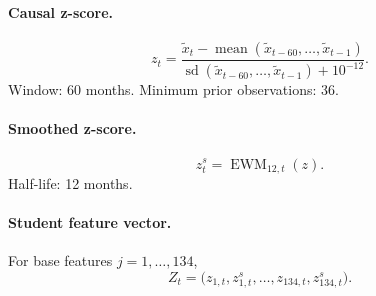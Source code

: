 \paragraph{Causal z-score.}
\begin{equation}
z_t
=
\frac{
\widetilde{x}_t-
\operatorname{mean}(\widetilde{x}_{t-60},\ldots,\widetilde{x}_{t-1})
}{
\operatorname{sd}(\widetilde{x}_{t-60},\ldots,\widetilde{x}_{t-1})+10^{-12}
}.
\end{equation}
Window: 60 months. Minimum prior observations: 36.

\paragraph{Smoothed z-score.}
\begin{equation}
z^s_t
=
\operatorname{EWM}_{12,t}(z).
\end{equation}
Half-life: 12 months.

\paragraph{Student feature vector.}
For base features \(j=1,\ldots,134\),
\begin{equation}
Z_t
=
\bigl(z_{1,t},z^s_{1,t},\ldots,z_{134,t},z^s_{134,t}\bigr).
\end{equation}

